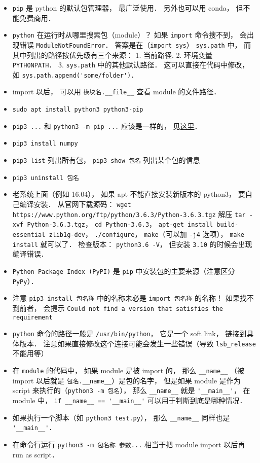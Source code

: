 

\begin{itemize}
\item \verb|pip| 是 python 的默认包管理器， 最广泛使用． 另外也可以用 conda， 但不能免费商用．
\item \verb|python| 在运行时从哪里搜索包（module）？ 如果 \verb|import| 命令搜不到， 会出现错误 \verb|ModuleNotFoundError|． 答案是在（\verb|import sys|） \verb|sys.path| 中， 而其中列出的路径按优先级有三个来源： 1. 当前路径. 2. 环境变量 \verb|PYTHONPATH|． 3. \verb|sys.path| 中的其他默认路径． 这可以直接在代码中修改， 如 \verb|sys.path.append('some/folder')|．
\item import 以后， 可以用 \verb|模块名.__file__| 查看 module 的文件路径．
\item \verb|sudo apt install python3 python3-pip|
\item \verb|pip3 ...| 和 \verb|python3 -m pip ...| 应该是一样的， 见\href{https://stackoverflow.com/questions/41307101/difference-between-pip3-and-python3-m-pip}{这里}．
\item \verb|pip3 install numpy|
\item \verb|pip3 list| 列出所有包， \verb|pip3 show 包名| 列出某个包的信息
\item \verb|pip3 uninstall 包名|
\item 老系统上面（例如 16.04）， 如果 apt 不能直接安装新版本的 python3， 要自己编译安装． 从官网下载源码： \verb|wget https://www.python.org/ftp/python/3.6.3/Python-3.6.3.tgz| 解压 \verb|tar -xvf Python-3.6.3.tgz|， \verb|cd Python-3.6.3|， \verb|apt-get install build-essential zlib1g-dev|， \verb|./configure|， \verb|make|（可以加 \verb|-j4| 选项）， \verb|make install| 就可以了． 检查版本： \verb|python3.6 -V|， 但安装 \verb|3.10| 的时候会出现编译错误．
\item \verb|Python Package Index (PyPI)| 是 \verb|pip| 中安装包的主要来源（注意区分 \verb|PyPy|）．
\item 注意 \verb|pip3 install 包名称| 中的名称未必是 \verb|import 包名称| 的名称！ 如果找不到前者， 会提示 \verb|Could not find a version that satisfies the requirement|
\item \verb|python| 命令的路径一般是 \verb|/usr/bin/python|， 它是一个 soft link， 链接到具体版本． 注意如果直接修改这个连接可能会发生一些错误（导致 \verb|lsb_release| 不能用等）
\item 在 \verb|module| 的代码中， 如果 module 是被 import 的， 那么 \verb|__name__| （被 import 以后就是 \verb|包名.__name__|）是包的名字， 但是如果 module 是作为 script 来执行的（\verb|python3 -m 包名|）， 那么 \verb|__name__| 就是 \verb|'__main__'|， 在 module 中， \verb|if __name__ == '__main__'| 可以用于判断到底是哪种情况．
\item 如果执行一个脚本（如 \verb|python3 test.py|）， 那么 \verb|__name__| 同样也是 \verb|'__main__'|．
\item 在命令行运行 \verb|python3 -m 包名称 参数...| 相当于把 module import 以后再 run as script．
\end{itemize}
